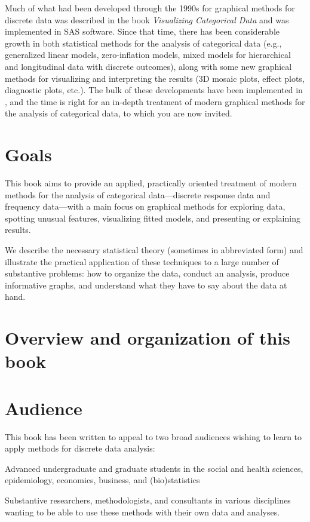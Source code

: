 Much of what had been developed through the 1990s for graphical methods for
discrete data was described in the book \emph{Visualizing Categorical Data}
\citep{Friendly:00:VCD} and was implemented in SAS\textsuperscript{\textregistered} software. 
Since that time,  
there has been considerable growth in both statistical methods for the
analysis of categorical data (e.g., generalized linear models, zero-inflation
models, mixed models for hierarchical and longitudinal data with discrete
outcomes), along with some new graphical methods for visualizing and
interpreting the results (3D mosaic plots, effect plots, diagnostic plots, etc.). 
The bulk of these developments have been implemented in \R, and the time is
right for an in-depth treatment of modern graphical methods for the analysis
of categorical data, to which you are now invited.

\section*{Goals}
This book aims to provide an applied, practically oriented treatment of 
modern methods for the analysis of categorical data---discrete response data
and frequency data---with a main focus on graphical methods for exploring data,
spotting unusual features, visualizing fitted models, and presenting or explaining
results.

We describe the necessary statistical theory (sometimes in abbreviated form)
and illustrate the practical application of these techniques to a large number
of substantive problems: how to organize the data, conduct an analysis, 
produce informative graphs, and understand what they have to say about the
data at hand.  

\section*{Overview and organization of this book}

 
\section*{Audience}
This book has been written to appeal to two broad audiences wishing to learn to apply methods for
discrete data analysis:
 \begin{itemize*}
   \item Advanced undergraduate and graduate students in the social and health sciences, epidemiology,
     economics, business, and (bio)statistics
 	\item Substantive researchers, methodologists, and consultants in various disciplines wanting to be able to use
 	 these methods with their own data and analyses.
 \end{itemize*}

